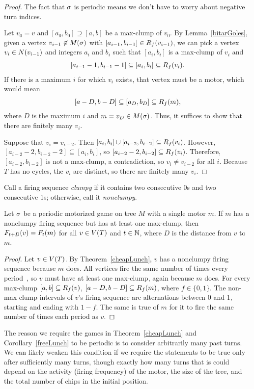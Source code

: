 \begin{proof}
The fact that $\s$ is periodic means we don't have to worry about negative turn
indices.

Let $v_0 = v$ and $[a_0, b_0] \supseteq [a, b]$ be a max-clump of $v_0$. By
Lemma~\ref{bitarGoles}, given a vertex $v_{i-1} \not\in \mots$ with $[a_{i-1},
  b_{i-1}] \in \pat{v_{i-1}}{f}$, we can pick a vertex $v_i \in \N{v_{i-1}}$
and integers $a_i$ and $b_i$ such that $[a_i, b_i]$ is a max-clump of $v_i$ and
\[
  [a_{i-1} - 1, b_{i-1} - 1] \subseteq [a_i, b_i] \subseteq \pat{v_i}{f}.
\]
If there is a maximum $i$ for which $v_i$ exists, that vertex must be a motor,
which would mean
\[
  [a-D, b-D] \subseteq [a_D, b_D] \subseteq \pat{m}{f},
\]
where $D$ is the maximum $i$ and $m = v_D \in \mots$. Thus, it suffices to show
that there are finitely many $v_i$.

Suppose that $v_i = v_{i-2}$. Then $[a_i, b_i] \cup [a_{i-2}, b_{i-2}]
\subseteq \pat{v_i}{f}$. However, $[a_{i-2} - 2, b_{i-2} - 2] \subseteq [a_i,
  b_i]$, so $[a_{i-2} - 2, b_{i-2}] \subseteq \pat{v_i}{f}$. Therefore,
$[a_{i-2}, b_{i-2}]$ is not a max-clump, a contradiction, so $v_i \neq v_{i-2}$
for all $i$. Because $T$ has no cycles, the $v_i$ are distinct, so there are
finitely many $v_i$.
\end{proof}

Call a firing sequence \emph{clumpy} if it contains two consecutive 0s and two
consecutive 1s; otherwise, call it \emph{nonclumpy}.

\begin{cor} \label{freeLunch}
Let $\s$ be a periodic motorized game on tree $M$ with a single motor $m$. If
$m$ has a nonclumpy firing sequence but has at least one max-clump, then
$\firing{v}{t+D} = \firing{m}{t}$ for all $v \in \V[T]$ and $t \in \nats$,
where $D$ is the distance from $v$ to $m$.
\end{cor}

\begin{proof}
Let $v \in \V[T]$. By Theorem~\ref{cheapLunch}, $v$ has a nonclumpy firing
sequence because $m$ does. All vertices fire the same number of times every
period~\cite[Proposition~2.5]{jiang}, so $v$ must have at least one max-clump,
again because $m$ does. For every max-clump $[a, b] \subseteq \pat{v}{f}$,
$[a-D, b-D] \subseteq \pat{m}{f}$, where $f \in \{0,1\}$. The non-max-clump
intervals of $v$'s firing sequence are alternations between 0 and 1, starting
and ending with $1-f$. The same is true of $m$ for it to fire the same number
of times each period as $v$.
\end{proof}

The reason we require the games in Theorem~\ref{cheapLunch} and
Corollary~\ref{freeLunch} to be periodic is to consider arbitrarily many past
turns. We can likely weaken this condition if we require the statements to be
true only after sufficiently many turns, though exactly how many turns that is
could depend on the activity (firing frequency) of the motor, the size of the
tree, and the total number of chips in the initial position.
